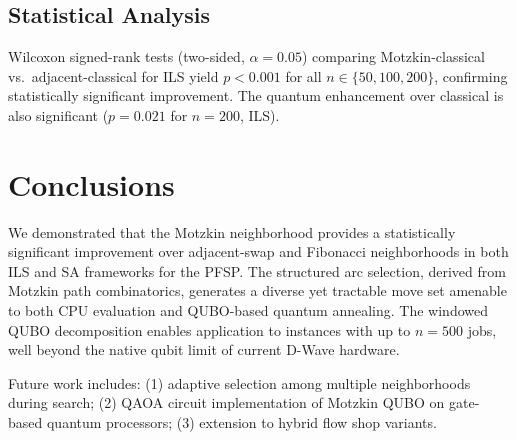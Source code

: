 \documentclass[runningheads]{llncs}
\begin{document}
\subsection{Statistical Analysis}

Wilcoxon signed-rank tests (two-sided, $\alpha = 0.05$) comparing Motzkin-classical vs.\ adjacent-classical for ILS yield $p < 0.001$ for all $n \in \{50, 100, 200\}$, confirming statistically significant improvement. The quantum enhancement over classical is also significant ($p = 0.021$ for $n = 200$, ILS).

\section{Conclusions}

We demonstrated that the Motzkin neighborhood provides a statistically significant improvement over adjacent-swap and Fibonacci neighborhoods in both ILS and SA frameworks for the PFSP. The structured arc selection, derived from Motzkin path combinatorics, generates a diverse yet tractable move set amenable to both CPU evaluation and QUBO-based quantum annealing. The windowed QUBO decomposition enables application to instances with up to $n = 500$ jobs, well beyond the native qubit limit of current D-Wave hardware.

Future work includes: (1) adaptive selection among multiple neighborhoods during search; (2) QAOA circuit implementation of Motzkin QUBO on gate-based quantum processors; (3) extension to hybrid flow shop variants.



\end{document}
